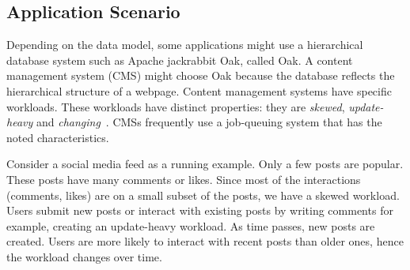 \documentclass[abstracton,12pt]{scrartcl}
\theoremstyle{definition}
\begin{document}

\subsection{Application Scenario}

\label{sec:application_scenario}

Depending on the data model, some applications might use a hierarchical database
system such as Apache jackrabbit Oak, called Oak. A content management system
(CMS) might choose Oak because
the database reflects the hierarchical structure of a webpage.
Content management systems have specific workloads.
These workloads have distinct properties: they are \textit{skewed},
\textit{update-heavy} and \textit{changing}~\cite{KW17}. CMSs frequently use a
job-queuing system that has the noted characteristics.

Consider a social media feed as a running example. Only a few posts are popular.
These posts have many comments or likes. Since most of the interactions
(comments, likes) are on a small subset of the posts, we have a skewed workload.
Users submit new posts or interact with existing posts by
writing comments for example, creating an update-heavy workload. As time
passes, new posts are created. Users are more likely to interact with recent
posts than older ones, hence the workload changes over time.
\end{document}

